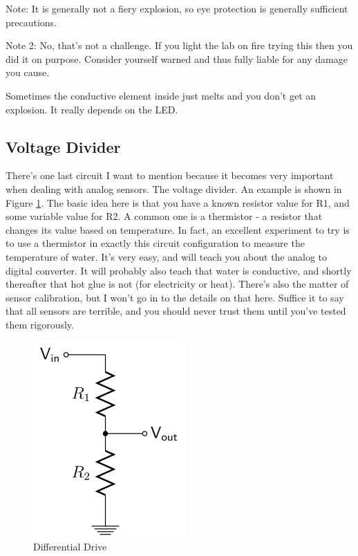 Note: It is generally not a fiery explosion, so eye protection is generally sufficient precautions.

Note 2: No, that's not a challenge. If you light the lab on fire trying this then you did it on purpose. Consider yourself warned and thus fully liable for any damage you cause.

Sometimes the conductive element inside just melts and you don't get an explosion. It really depends on the LED.

\subsection{Voltage Divider}

There's one last circuit I want to mention because it becomes very important when dealing with analog sensors. The voltage divider. An example is shown in Figure \ref{fig:voltagedivider}. The basic idea here is that you have a known resistor value for R1, and some variable value for R2. A common one is a thermistor - a resistor that changes its value based on temperature. In fact, an excellent experiment to try is to use a thermistor in exactly this circuit configuration to measure the temperature of water. It's very easy, and will teach you about the analog to digital converter. It will probably also teach that water is conductive, and shortly thereafter that hot glue is not (for electricity or heat). There's also the matter of sensor calibration, but I won't go in to the details on that here. Suffice it to say that all sensors are terrible, and you should never trust them until you've tested them rigorously.

\begin{figure}[h]
\centering
\includegraphics[scale=0.75]{voltagedivider.png}
\caption{Differential Drive}
\label{fig:voltagedivider}
\end{figure}

